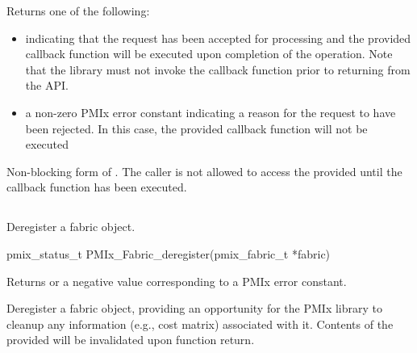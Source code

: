 \begin{arglist}
\end{arglist}

Returns one of the following:

\begin{itemize}
\item {} indicating that the request has been accepted for processing and the provided callback function will be executed upon completion of the operation. Note that the library must not invoke the callback function prior to returning from the \ac{API}.
\item a non-zero \ac{PMIx} error constant indicating a reason for the request to have been rejected. In this case, the provided callback function will not be executed
\end{itemize}

\descr

Non-blocking form of . The caller is not allowed to access the provided  until the callback function has been executed.


\subsection{}

\summary

Deregister a fabric object.

\format

\cspecificstart
\begin{codepar}
pmix_status_t PMIx_Fabric_deregister(pmix_fabric_t *fabric)
\end{codepar}
\cspecificend

\begin{arglist}
\end{arglist}

Returns  or a negative value corresponding to a \ac{PMIx} error constant.

\descr

Deregister a fabric object, providing an opportunity for the \ac{PMIx} library to cleanup any information (e.g., cost matrix) associated with it. Contents of the provided  will be invalidated upon function return.


